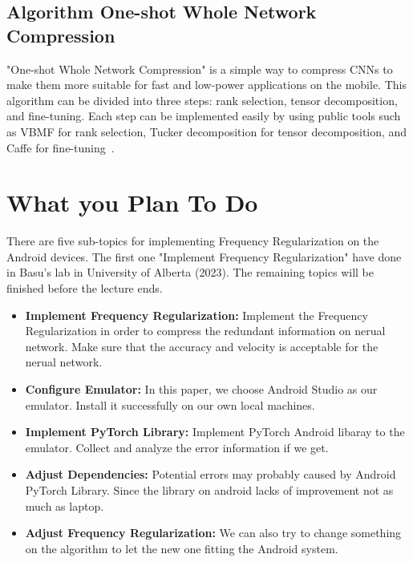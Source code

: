 \documentclass{article}
\begin{document}
\subsection{Algorithm One-shot Whole Network Compression}\label{oneshot}
"One-shot Whole Network Compression" is a simple way to compress CNNs to make them more suitable for fast and low-power applications on the mobile. This algorithm can be divided into three steps: rank selection, tensor decomposition, and fine-tuning. Each step can be implemented easily by using public tools such as VBMF for rank selection, Tucker decomposition for tensor decomposition, and Caffe for fine-tuning~\cite{kim2016compression}.

\section*{What you Plan To Do}
There are five sub-topics for implementing Frequency Regularization on the Android devices. The first one "Implement Frequency Regularization" have done in Basu's lab in University of Alberta (2023). The remaining topics will be finished before the lecture ends.


\begin{itemize}
	\item \textbf{Implement Frequency Regularization:} Implement the Frequency Regularization in order to compress the redundant information on nerual network. Make sure that the accuracy and velocity is acceptable for the nerual network.
	
	\item \textbf{Configure Emulator:} In this paper, we choose Android Studio as our emulator. Install it successfully on our own local machines.
	
	\item \textbf{Implement PyTorch Library:} Implement PyTorch Android libaray to the emulator. Collect and analyze the error information if we get.
	
	\item \textbf{Adjust Dependencies:} Potential errors may probably caused by Android PyTorch Library. Since the library on android lacks of improvement not as much as laptop.
	
	\item \textbf{Adjust Frequency Regularization:} We can also try to change something on the algorithm to let the new one fitting the Android system.
	
\end{itemize}
\end{document}
